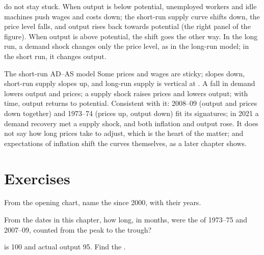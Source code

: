  do not stay stuck. When output is below potential, unemployed workers and idle machines push wages and costs down; the short-run supply curve shifts down,
the price level falls, and output rises back towards potential (the right panel of the figure). When output is above potential, the shift goes the other way. In the
long run, a demand shock changes only the price level, as in the long-run model; in the short run, it changes output.

\begin{model}{The short-run AD--AS model}
\assumes Some prices and wages are sticky;  slopes down, short-run supply slopes up, and long-run supply is vertical at .
\predicts A fall in demand lowers output and prices; a supply shock raises prices and lowers output; with time, output returns to potential.
\tested Consistent with it: 2008--09 (output and prices down together) and 1973--74 (prices up, output down) fit its signatures; in 2021 a demand recovery met a supply shock, and both
  inflation and output rose.
\breaks It does not say how long prices take to adjust, which is the heart of the matter; and expectations of inflation shift the curves themselves, as a later chapter
  shows.
\end{model}

\section{Exercises}

\begin{exercise}[$\star$]\label{exo:g12:aggregate-demand-and-supply:1}
From the opening chart, name the  since 2000, with their years.
\end{exercise}

\begin{exercise}[$\star$]\label{exo:g12:aggregate-demand-and-supply:2}
From the dates in this chapter, how long, in months, were the  of 1973--75 and 2007--09, counted from the peak to the trough?
\end{exercise}

\begin{exercise}[$\star$]\label{exo:g12:aggregate-demand-and-supply:3}
 is 100 and actual output 95. Find the .
\end{exercise}

